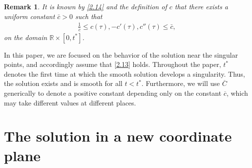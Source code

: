 \documentclass[11pt,reqno]{article}
\newtheorem{rem}{Remark}
\newcommand{\eps}{\varepsilon}
\newcommand{\fr}{\frac}
\newcommand{\pa}{\partial}
\numberwithin{equation}{section}
\begin{document}
%

\begin{rem}\label{r1}
It is known by \eqref{2.14} and the definition of $c$ that there exists a uniform constant $\bar{c}>0$ such that
\begin{align}\label{2.22}
\fr{1}{\bar{c}}\leq c(\tau), -c'(\tau), c''(\tau)\leq \bar{c},
\end{align}
on the domain $\mathbb{R}\times[0,t^*]$.
\end{rem}


In this paper, we are focused on the behavior of the solution near the singular points, and accordingly assume that \eqref{2.13} holds. Throughout the paper, $t^*$ denotes the first time at which the smooth solution develops a singularity. Thus, the solution exists and is smooth for all $t<t^*$.
Furthermore, we will use $\overline{C}$ generically to denote a positive constant depending only on the constant $\overline{c}$, which may take different values at different places.


\section{The solution in a new coordinate plane}\label{S3}
\end{document}
